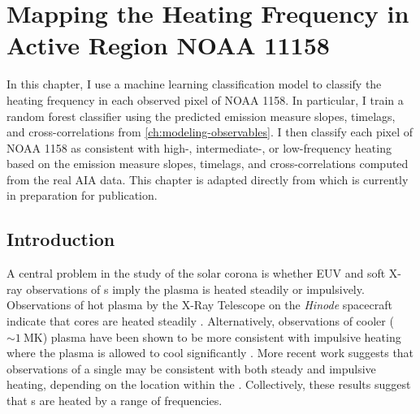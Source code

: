 \chapter{Mapping the Heating Frequency in Active Region NOAA 11158}\label{ch:classifying-observables}

In this chapter, I use a machine learning classification model to classify the heating frequency in each observed pixel of \AR{} NOAA 1158. In particular, I train a random forest classifier using the predicted emission measure slopes, timelags, and cross-correlations from \autoref{ch:modeling-observables}. I then classify each pixel of NOAA 1158 as consistent with high-, intermediate-, or low-frequency heating based on the emission measure slopes, timelags, and cross-correlations computed from the real AIA data. This chapter is adapted directly from \citet{barnes_understanding_2019-1} which is currently in preparation for publication.

\section{Introduction}\label{sec:classifying-observables:introduction}

A central problem in the study of the solar corona is whether EUV and soft X-ray observations of \AR s imply the plasma is heated steadily or impulsively. Observations of hot plasma by the X-Ray Telescope \citep[XRT,][]{golub_x-ray_2007} on the \textit{Hinode} spacecraft \citep{kosugi_hinode_2007} indicate that \AR{} cores are heated steadily \citep[e.g.][]{warren_constraints_2011,winebarger_using_2011}. Alternatively, observations of cooler ($\sim\SI{1}{\mega\kelvin}$) plasma have been shown to be more consistent with impulsive heating where the plasma is allowed to cool significantly \citep[e.g]{winebarger_evolving_2003,mulu-moore_determining_2011,ugarte-urra_investigation_2006,viall_patterns_2011,viall_evidence_2012}. More recent work \citep{del_zanna_evolution_2015,bradshaw_patterns_2016} suggests that observations of a single \AR{} may be consistent with both steady and impulsive heating, depending on the location within the \AR{}. Collectively, these results suggest that \AR s are heated by a range of frequencies.

